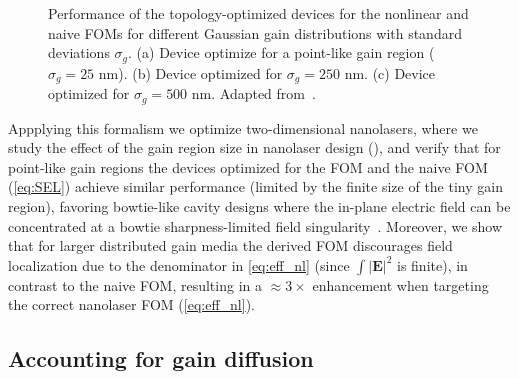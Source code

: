 \begin{figure}[tb]
    \centering
    \caption{Performance of the topology-optimized devices for the nonlinear and naive FOMs for different Gaussian gain distributions with standard deviations $\sigma_g$. (a) Device optimize for a point-like gain region ($\sigma_g=25$ nm).
    (b) Device optimized for $\sigma_g=250$ nm. (c) Device optimized for $\sigma_g=500$ nm. Adapted from~\cite{ownpub4}.}
    \label{fig:laser_size}
\end{figure}

Appplying this formalism we optimize two-dimensional nanolasers, where we study the effect of the gain region size in 
nanolaser design (), and verify that for point-like gain regions the devices optimized for the FOM and the naive FOM (\eqref{eq:SEL})
achieve similar performance (limited by the finite size of the tiny gain region), favoring bowtie-like cavity designs
where the in-plane electric field can be concentrated at a bowtie sharpness-limited field singularity~\cite{sing}. Moreover, we show that for
larger distributed gain media the derived FOM discourages field localization due to the denominator in \eqref{eq:eff_nl} (since $\int \vert \mathbf{E} \vert^2$ is finite), in contrast to the naive FOM, 
resulting in a $\approx 3\times$ enhancement when targeting the correct nanolaser FOM (\eqref{eq:eff_nl}). 
\subsection*{Accounting for gain diffusion}

